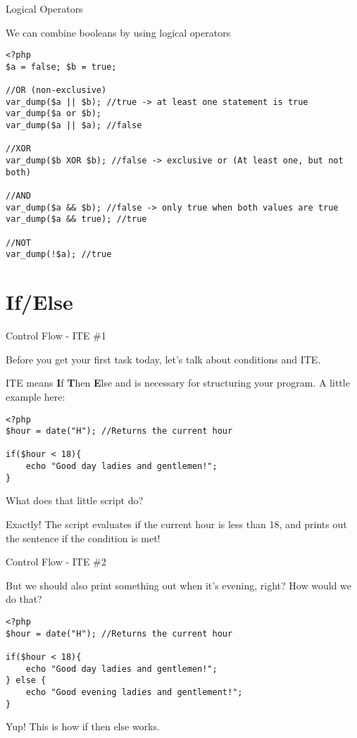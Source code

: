 \begin{frame}[fragile]{Logical Operators}

We can combine booleans by using logical operators\pause
\begin{lstlisting}
<?php
$a = false; $b = true;

//OR (non-exclusive)
var_dump($a || $b); //true -> at least one statement is true
var_dump($a or $b);
var_dump($a || $a); //false

//XOR
var_dump($b XOR $b); //false -> exclusive or (At least one, but not both)

//AND
var_dump($a && $b); //false -> only true when both values are true
var_dump($a && true); //true

//NOT
var_dump(!$a); //true
\end{lstlisting}

\end{frame}

\section{If/Else}
\begin{frame}[fragile]{Control Flow - ITE \#{}1}

Before you get your first task today, let's talk about conditions and ITE.\pause

ITE means \textbf{I}f \textbf{T}hen \textbf{E}lse and is necessary for structuring your program. A little example here: \pause
\begin{lstlisting}
<?php
$hour = date("H"); //Returns the current hour

if($hour < 18){
	echo "Good day ladies and gentlemen!";
}
\end{lstlisting} 
\pause

What does that little script do? \pause

Exactly! The script evaluates if the current hour is less than 18, and prints out the sentence if the condition is met!

\end{frame}

\begin{frame}[fragile]{Control Flow - ITE \#{}2}

But we should also print something out when it's evening, right?
How would we do that? \pause
\begin{lstlisting}
<?php
$hour = date("H"); //Returns the current hour

if($hour < 18){
	echo "Good day ladies and gentlemen!";
} else {
    echo "Good evening ladies and gentlement!";
}
\end{lstlisting} 
\pause

Yup! This is how if then else works.

\end{frame}

